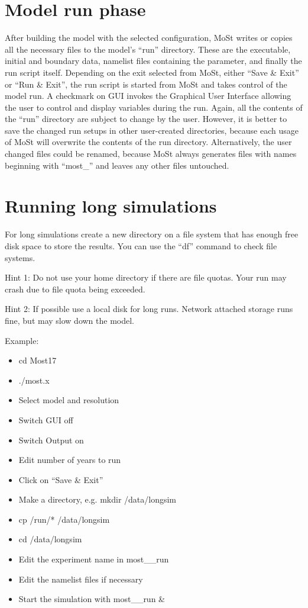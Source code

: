 \section{Model run phase}

After building the model with the selected configuration,
MoSt writes or copies all the necessary files to the model's
``run'' directory. These are the executable, initial and boundary data,
namelist files containing the parameter, and finally the
run script itself. Depending on the exit selected from MoSt,
either ``Save \& Exit'' or ``Run \& Exit'', the run script is started
from MoSt and takes control of the model run. A checkmark on
GUI invokes the Graphical User Interface allowing the user to control
and display variables during the run.
Again, all the contents of the ``run'' directory are subject to change
by the user. However, it is better to save the changed run setups
in other user-created directories, because each usage of
MoSt will overwrite the contents of the run directory.
Alternatively, the user changed files could be renamed,
because MoSt always generates files with names beginning with ``most\_''
and leaves any other files untouched.

\section{Running long simulations}

For long simulations create a new directory on a file system
that has enough free disk space to store the results.
You can use the ``df'' command to check file systems.

Hint 1: Do not use your home directory if there are file quotas.
Your run may crash due to file quota being exceeded.

Hint 2: If possible use a local disk for long runs.
Network attached storage runs fine, but may slow down the model.

Example:

\begin{itemize}
\item cd Most17
\item ./most.x
\item Select model and resolution
\item Switch GUI off
\item Switch Output on
\item Edit number of years to run
\item Click on ``Save \& Exit''
\item Make a directory, e.g. mkdir /data/longsim
\item cp {\modir/run/*} /data/longsim
\item cd /data/longsim
\item Edit the experiment name in most\_\modir\_run
\item Edit the namelist files if necessary
\item Start the simulation with most\_\modir\_run \&
\end{itemize}

